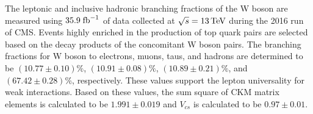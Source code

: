 \abstract

The leptonic and inclusive hadronic branching fractions of the W boson are measured using $35.9 \; \rm{fb}^{-1}$ of data collected at $\sqrt{s}=13\,\text{Te\hspace{-.08em}V}$ during the 2016 run of CMS.  Events highly enriched in the production of top quark pairs are selected based on the decay products of the concomitant W boson pairs. The branching fractions for W boson to electrons, muons, taus, and hadrons are determined to be $ (10.77 \pm 0.10)\%$, $(10.91 \pm 0.08)\%$, $(10.89 \pm 0.21)\%$, and $(67.42 \pm 0.28)\%$, respectively. These values support the lepton universality for weak interactions. Based on these values, the sum square of CKM matrix elements is calculated to be $1.991\pm 0.019$ and $V_{cs}$ is calculated to be $0.97 \pm 0.01$.